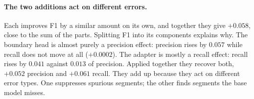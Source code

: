 \documentclass{article}
\begin{document}
\begin{table}[t]
\centering
\caption{$5\times4$ nested cross-validation with the corrected matcher, mean $\pm$ std.\ over the
five outer folds. Precision and recall are at the headline $\pm3$ tolerance; the four F1 columns
tighten the boundary-match tolerance to an exact residue. \emph{Growth} is how much a row's F1
advantage over the ESM-2 base widens between $\pm3$ and an exact match, so a value near zero would
mean its tolerance curve is a parallel translation of the baseline.}
\label{tab:main-results}
\small
{}
\end{table}

\paragraph{The two additions act on different errors.} Each improves F1 by a similar amount on its own, and together they give $+0.058$, close to the sum of the parts. Splitting F1 into its components explains why. The boundary head is almost purely a precision effect: precision rises by $0.057$ while recall does not move at all ($+0.0002$). The adapter is mostly a recall effect: recall rises by $0.041$ against $0.013$ of precision. Applied together they recover both, $+0.052$ precision and $+0.061$ recall. They add up because they act on different error types. One suppresses spurious segments; the other finds segments the base model misses.
\end{document}
